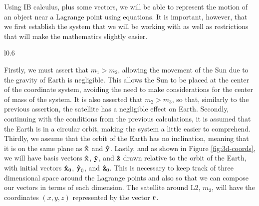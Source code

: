 Using IB calculus, plus some vectors, we will be able to represent the motion of an object near a Lagrange point using equations.
It is important, however, that we first establish the system that we will be working with as well as restrictions that will make the mathematics slightly easier.
\begin{wrapfigure}{l}{0.6\textwidth}
	\centering
	\vspace*{0.25cm}
	\caption{three-dimensional diagram of the Sun-Earth system with unit vectors relative to the Earth's orbit. Not drawn to scale.}
	\label{fig:3d-coords}
\end{wrapfigure}
Firstly, we must assert that $m_1 > m_2$, allowing the movement of the Sun due to the gravity of Earth is negligible.
This allows the Sun to be placed at the center of the coordinate system, avoiding the need to make considerations for the center of mass of the system.
It is also asserted that $m_2 > m_3$, so that, similarly to the previous assertion, the satellite has a negligible effect on Earth.
Secondly, continuing with the conditions from the previous calculations, it is assumed that the Earth is in a circular orbit, making the system a little easier to comprehend.
Thirdly, we assume that the orbit of the Earth has no inclination, meaning that it is on the same plane as $\uvec{x}$ and $\uvec{y}$.
Lastly, and as shown in Figure \ref{fig:3d-coords}, we will have basis vectors $\uvec{x}$, $\uvec{y}$, and $\uvec{z}$ drawn relative to the orbit of the Earth, with initial vectors $\uvec{x}_0$, $\uvec{y}_0$, and $\uvec{z}_0$.
This is necessary to keep track of three dimensional space around the Lagrange points and also so that we can compose our vectors in terms of each dimension.
The satellite around L2, $m_3$, will have the coordinates $(x,y,z)$ represented by the vector $\bm{\mathbf{r}}$.

